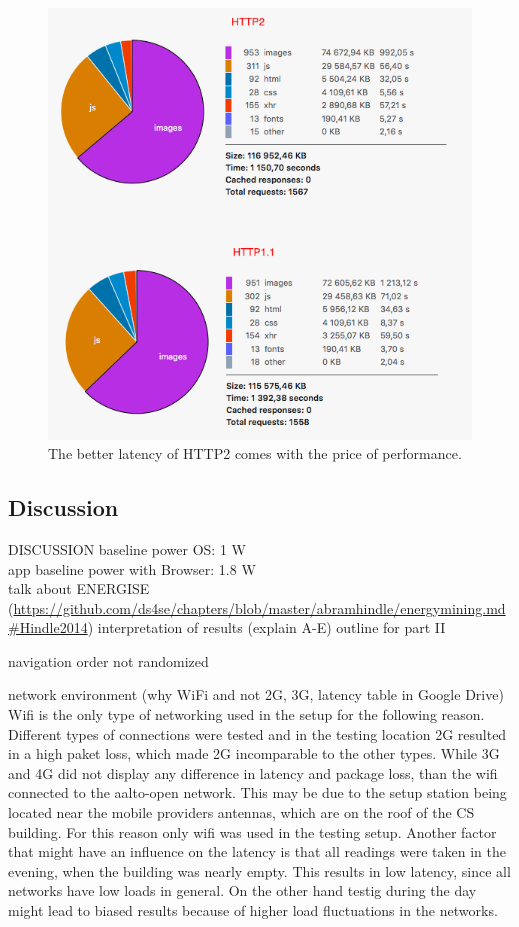 \documentclass{article}
\begin{document}
\begin{figure}[h!]
\centering
\includegraphics[scale=0.6]{images/http2_consumes.png}
\caption{The better latency of HTTP2 comes with the price of performance.}
\label{fig:http2_network_traffic}
\end{figure}

\clearpage

\subsection{Discussion}
\label{chapter:discussion}

DISCUSSION
    baseline power OS: 1 W \\
    app baseline power with Browser: 1.8 W \\
    talk about ENERGISE (\url{https://github.com/ds4se/chapters/blob/master/abramhindle/energymining.md#Hindle2014})
    interpretation of results (explain A-E)
    outline for part II

navigation order not randomized

network environment (why WiFi and not 2G, 3G, latency table in Google Drive)
Wifi is the only type of networking used in the setup for the following reason.
Different types of connections were tested and in the testing location 2G resulted in a high paket loss, which made 2G incomparable to the other types. While 3G and 4G did not display any difference in latency and package loss, than the wifi connected to the aalto-open network. This may be due to the setup station being located near the mobile providers antennas, which are on the roof of the CS building. For this reason only wifi was used in the testing setup. Another factor that might have an influence on the latency is that all readings were taken in the evening, when the building was nearly empty. This results in low latency, since all networks have low loads in general. On the other hand testig during the day might lead to biased results because of higher load fluctuations in the networks.
\end{document}
